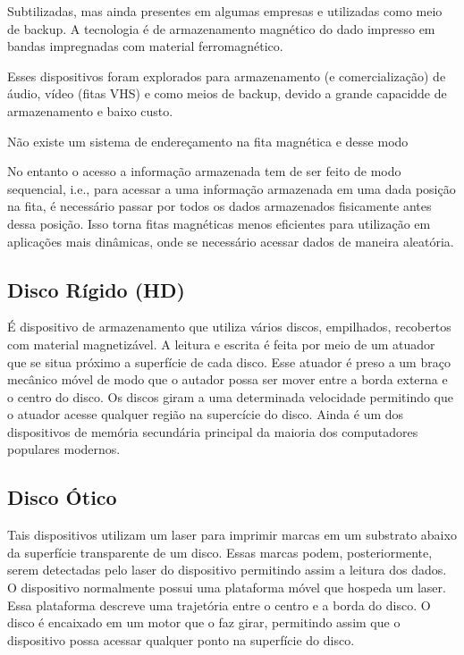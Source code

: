 \documentclass[a4paper,11pt]{book}
\begin{document}
     Subtilizadas, mas ainda presentes em algumas empresas e utilizadas como meio de backup. A tecnologia é de armazenamento magnético do dado
     impresso em bandas impregnadas com material ferromagnético. 
     
     Esses dispositivos foram explorados para armazenamento (e comercialização) de áudio, vídeo (fitas VHS) e como meios de backup, devido
     a grande capacidde de armazenamento e baixo custo. 
     
     Não existe um sistema de endereçamento na fita magnética e desse modo  
     
     No entanto o acesso a informação armazenada tem de ser feito de modo sequencial, i.e., para acessar a uma informação armazenada em uma
     dada posição na fita, é necessário passar por todos os dados armazenados fisicamente antes dessa posição. Isso torna fitas magnéticas 
     menos eficientes para utilização em aplicações mais dinâmicas, onde se necessário acessar dados de maneira aleatória.
   
   
   \subsection{Disco Rígido (HD)}
       É dispositivo de armazenamento que utiliza vários discos, empilhados, recobertos com material magnetizável. A leitura e escrita
       é feita por meio de um atuador que se situa próximo a superfície de cada disco. Esse atuador é preso a um braço mecânico móvel de modo que o autador possa 
       ser mover entre a borda externa e o centro do disco. Os discos giram a uma determinada velocidade permitindo que o atuador acesse qualquer região na
       supercície do disco. Ainda é um dos dispositivos de memória secundária principal da maioria dos computadores populares modernos.
   
   \subsection{Disco Ótico}
       
       Tais dispositivos utilizam um laser para imprimir marcas em um substrato abaixo da superfície
       transparente de um disco. Essas marcas podem, posteriormente, serem detectadas pelo laser do dispositivo permitindo assim a leitura dos dados.
       O dispositivo normalmente possui uma plataforma móvel que hospeda um laser. Essa plataforma descreve uma trajetória entre o centro e a borda do disco.
       O disco é encaixado em um motor que o faz girar, permitindo assim que o dispositivo possa acessar qualquer ponto na superfície do disco.
   
\end{document}
